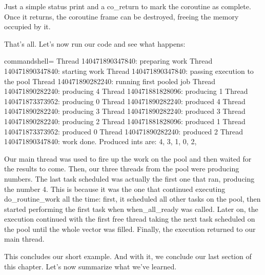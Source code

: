 Just a simple status print and a co\_return to mark the coroutine as complete. Once it returns, the coroutine frame can be destroyed, freeing the memory occupied by it.

That's all. Let's now run our code and see what happens:

\begin{tcblisting}{commandshell={}}
Thread 140471890347840: preparing work
Thread 140471890347840: starting work
Thread 140471890347840: passing execution to the pool
Thread 140471890282240: running first pooled job
Thread 140471890282240: producing 4
Thread 140471881828096: producing 1
Thread 140471873373952: producing 0
Thread 140471890282240: produced 4
Thread 140471890282240: producing 3
Thread 140471890282240: produced 3
Thread 140471890282240: producing 2
Thread 140471881828096: produced 1
Thread 140471873373952: produced 0
Thread 140471890282240: produced 2
Thread 140471890347840: work done. Produced ints are: 4, 3, 1, 0, 2,
\end{tcblisting}

Our main thread was used to fire up the work on the pool and then waited for the results to come. Then, our three threads from the pool were producing numbers. The last task scheduled was actually the first one that ran, producing the number 4. This is because it was the one that continued executing do\_routine\_work all the time: first, it scheduled all other tasks on the pool, then started performing the first task when when\_all\_ready was called. Later on, the execution continued with the first free thread taking the next task scheduled on the pool until the whole vector was filled. Finally, the execution returned to our main thread.

This concludes our short example. And with it, we conclude our last section of this chapter. Let's now summarize what we've learned.


